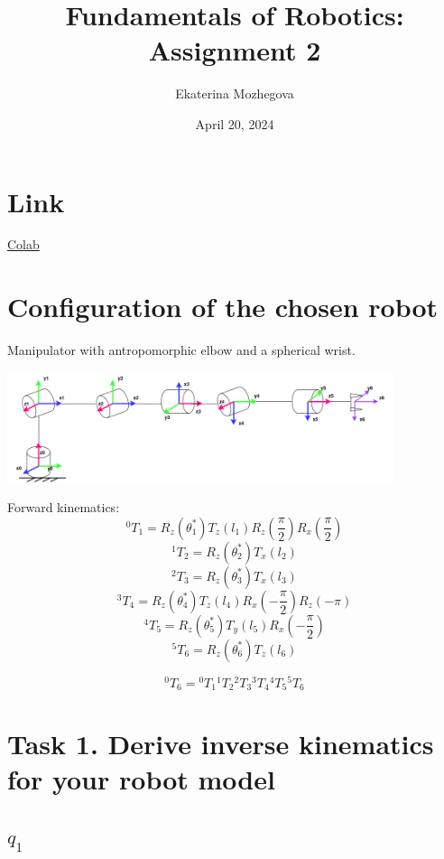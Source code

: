 \documentclass{article}
\title{Fundamentals of Robotics: Assignment 2}
\author{Ekaterina Mozhegova}
\date{April 20, 2024}
\begin{document}
\maketitle

\section{Link}

\href{https://colab.research.google.com/drive/1hU13PXIqbAtPv2cby5qNB10PobzW39JC?usp=sharing}{Colab}

\section{Configuration of the chosen robot}

Manipulator with antropomorphic elbow and a spherical wrist. 

\begin{center}
    \includegraphics*[width=0.85\textwidth]{images/new_manipulator.png}
\end{center}

Forward kinematics:
\[{}^0T_1 = R_z(\theta_1^*) T_z(l_1) R_z(\frac{\pi}{2}) R_x(\frac{\pi}{2})\]
\[{}^1T_2 = R_z(\theta_2^*) T_x(l_2) \]
\[{}^2T_3 = R_z(\theta_3^*) T_x(l_3) \]
\[{}^3T_4 = R_z(\theta_4^*) T_z(l_4) R_x(-\dfrac{\pi}{2}) R_z(-\pi)\]
\[{}^4T_5 = R_z(\theta_5^*) T_y(l_5) R_x(-\dfrac{\pi}{2})\]
\[{}^5T_6 = R_z(\theta_6^*) T_z(l_6) \]

\[{}^0T_6 = {}^0T_1 {}^1T_2 {}^2T_3 {}^3T_4 {}^4T_5 {}^5T_6 \]




\section{Task 1. Derive inverse kinematics for your robot model}

\subsection{$q_1$}
\end{document}
